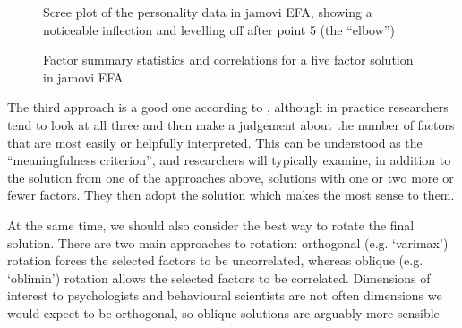 \begin{figure}[!htb]
\begin{center}
\caption{Scree plot of the personality data in jamovi EFA, showing a noticeable inflection and levelling off after point 5 (the “elbow”)}
\label{fig:fa5}
\HR
\end{center}
\end{figure}

\begin{figure}[!htb]
\begin{center}
\caption{Factor summary statistics and correlations for a five factor solution in jamovi EFA}
\label{fig:fa6}
\HR
\end{center}
\end{figure}

The third approach is a good one according to \textcite{Fabrigar1999}, although in practice researchers tend to look at all three and then make a judgement about the number of factors that are most easily or helpfully interpreted. This can be understood as the ``meaningfulness criterion'', and researchers will typically examine, in addition to the solution from one of the approaches above, solutions with one or two more or fewer factors. They then adopt the solution which makes the most sense to them.

At the same time, we should also consider the best way to rotate the final solution. There are two main approaches to rotation: orthogonal (e.g. `varimax') rotation forces the selected factors to be uncorrelated, whereas oblique (e.g. `oblimin') rotation allows the selected factors to be correlated. Dimensions of interest to psychologists and behavioural scientists are not often dimensions we would expect to be orthogonal, so oblique solutions are arguably more sensible 

